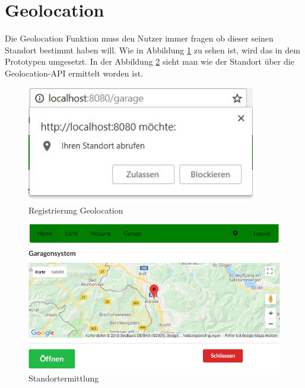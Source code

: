 \section{Geolocation}
Die Geolocation Funktion muss den Nutzer immer fragen ob dieser seinen Standort bestimmt haben will. Wie in Abbildung \ref{fig:Registrierung} zu sehen ist, wird das in dem Prototypen umgesetzt. In der Abbildung \ref{fig:Maps} sieht man wie der Standort über die Geolocation-API ermittelt worden ist.

\begin{figure}[h]
	\centering
	\includegraphics[width=10cm]{BilderAllgemein/Geolocation/Registrierung}\medskip
	\caption{Registrierung Geolocation}
	\label{fig:Registrierung}
\end{figure}

\begin{figure}[h]
	\centering
	\includegraphics[width=14cm]{BilderAllgemein/Geolocation/Maps}\medskip
	\caption{Standortermittlung}
	\label{fig:Maps}
\end{figure}

\newpage
